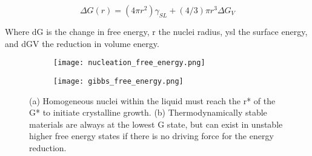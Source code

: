 \documentclass[a4paper,12pt,oneside]{report}%
\begin{document}
\begin{equation}
\Delta G(r) = (4 \pi r^2 ) \gamma_{SL}+(4/3) \pi r^3 \Delta G_{V} 
\label{equ:Homo}
\end{equation}

Where \acrshort{dG} is the change in free energy, \acrshort{r} the nuclei radius, \acrshort{ysl} the surface energy, and \acrshort{dGV} the reduction in volume energy.

\begin{figure}[h]
	\centering
	\begin{subfigure}[htbp]{0.49\textwidth}
		\texttt{[image: nucleation\_free\_energy.png]}
		\caption{}
		\label{fig:GibbsNucleation}
	\end{subfigure}
	\begin{subfigure}[htbp]{0.49\textwidth}
		\texttt{[image: gibbs\_free\_energy.png]}
		\caption{}
		\label{fig:FreeEnergy}
	\end{subfigure}
	\caption{(a) Homogeneous nuclei within the liquid must reach the \gls{r*} of the \gls{G*} to initiate crystalline growth. (b) Thermodynamically stable materials are always at the lowest \gls{G} state, but can exist in unstable higher free energy states if there is no driving force for the energy reduction.}%
	\label{fig:Gibbs}
\end{figure}
\end{document}
